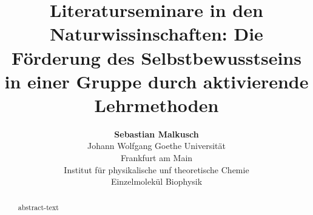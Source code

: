 \documentclass[10pt,a4paper,onecolumn,notitlepage]{article}
\author{
	{\bf Sebastian Malkusch}\\Johann Wolfgang Goethe Universität\\Frankfurt am Main\\Institut für physikalische unf theoretische Chemie\\Einzelmolekül Biophysik
}
\title{
Literaturseminare in den Naturwissinschaften: Die Förderung des Selbstbewusstseins in einer Gruppe durch aktivierende Lehrmethoden
}
\begin{document}
\maketitle
\begin{abstract}
   abstract-text
\end{abstract}
\tableofcontents
\twocolumn
\sloppy






%
\end{document}
